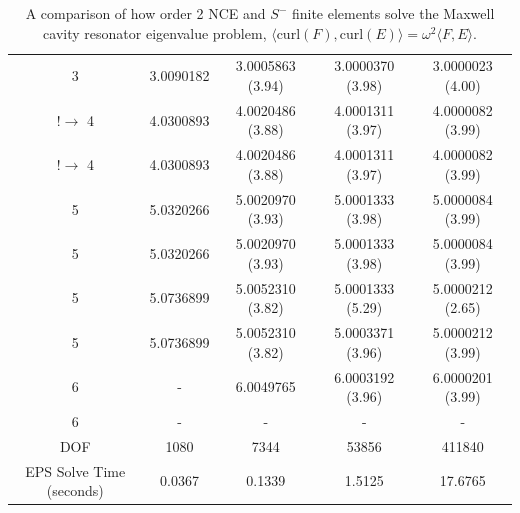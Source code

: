 \documentclass[manuscript,screen]{acmart}
\newcommand{\akg}[1]{\textcolor{blue}{\textbf{AG:} #1}}
\begin{document}
\begin{center}
\begin{table}
\begin{tabular}{ c c c c c }
3 & 3.0090182 & 3.0005863 (3.94) & 3.0000370 (3.98) & 3.0000023 (4.00) \\
$! \rightarrow$ 4 & 4.0300893 & 4.0020486 (3.88) & 4.0001311 (3.97) & 4.0000082 (3.99) \\
$! \rightarrow$ 4 & 4.0300893 & 4.0020486 (3.88) & 4.0001311 (3.97) & 4.0000082 (3.99) \\
5 & 5.0320266 & 5.0020970 (3.93)& 5.0001333 (3.98) & 5.0000084 (3.99) \\
5 & 5.0320266 & 5.0020970 (3.93)& 5.0001333 (3.98) & 5.0000084 (3.99) \\
5 & 5.0736899 & 5.0052310 (3.82) & 5.0001333 (5.29) & 5.0000212 (2.65) \\
5 & 5.0736899 & 5.0052310 (3.82) & 5.0003371 (3.96) & 5.0000212 (3.99) \\
6 & - & 6.0049765 & 6.0003192 (3.96) & 6.0000201 (3.99) \\
6 & - & - & - & - \\
\hline
DOF  & 1080 & 7344 & 53856 & 411840 \\
\hline
EPS Solve Time (seconds) & 0.0367 & 0.1339 & 1.5125 & 17.6765 \\
\hline

\end{tabular}
\caption{A comparison of how order 2 NCE and $S^-$ finite elements solve the Maxwell cavity resonator eigenvalue problem, $\langle \text{curl}(F), \text{curl}(E) \rangle = \omega^2 \langle F, E \rangle$. }  
\label{tab:Eigenvalue}
\end{table}
\end{center}

\end{document}
